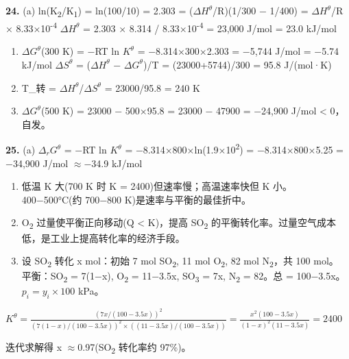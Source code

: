 \documentclass[a4paper,11pt]{ctexart}
\newcommand{\箭}{\ensuremath{\rightarrow}}
\newcommand{\左箭}{\ensuremath{\leftarrow}}
\newcommand{\上箭}{\ensuremath{\uparrow}}
\newcommand{\下箭}{\ensuremath{\downarrow}}
\newcommand{\衡}{\ensuremath{\rightleftharpoons}}
\newcommand{\双箭}{\ensuremath{\leftrightarrow}}
\newcommand{\约等于}{\ensuremath{\approx}}
\newcommand{\小于等于}{\ensuremath{\leq}}
\newcommand{\大于等于}{\ensuremath{\geq}}
\newcommand{\不等于}{\ensuremath{\neq}}
\newcommand{\西格马}{\ensuremath{\sigma}}
\newcommand{\派}{\ensuremath{\pi}}
\begin{document}
\textbf{24.}
(a) ln(K\textsubscript{2}/K\textsubscript{1}) = ln(100/10) = 2.303 = (\(\Delta H^\theta\)/R)(1/300 − 1/400) = \(\Delta H^\theta\)/R × 8.33×10\textsuperscript{-4}
\(\Delta H^\theta\) = 2.303 × 8.314 / 8.33×10\textsuperscript{-4} = 23,000 J/mol = 23.0 kJ/mol

\begin{enumerate}
\def\labelenumi{(\alph{enumi})}
\setcounter{enumi}{1}
\item
  \(\Delta G^\theta\)(300 K) = −RT ln \(K^\theta\) = −8.314×300×2.303 = −5,744 J/mol = −5.74 kJ/mol
  \(\Delta S^\theta\) = (\(\Delta H^\theta\) − \(\Delta G^\theta\))/T = (23000+5744)/300 = 95.8 J/(mol·K)
\item
  T\_转 = \(\Delta H^\theta\)/\(\Delta S^\theta\) = 23000/95.8 = 240 K
\item
  \(\Delta G^\theta\)(500 K) = 23000 − 500×95.8 = 23000 − 47900 = −24,900 J/mol \textless{} 0，自发。
\end{enumerate}

\textbf{25.}
(a) \(\Delta_r G^\theta\) = −RT ln \(K^\theta\) = −8.314×800×ln(1.9×10\textsuperscript{2}) = −8.314×800×5.25 = −34,900 J/mol \约等于 −34.9 kJ/mol

\begin{enumerate}
\def\labelenumi{(\alph{enumi})}
\setcounter{enumi}{1}
\item
  低温 K 大(700 K 时 K = 2400)但速率慢；高温速率快但 K 小。400−500°C(约 700−800 K)是速率与平衡的最佳折中。
\item
  O\textsubscript{2} 过量使平衡正向移动(Q \textless{} K)，提高 SO\textsubscript{2} 的平衡转化率。过量空气成本低，是工业上提高转化率的经济手段。
\item
  设 SO\textsubscript{2} 转化 x mol：初始 7 mol SO\textsubscript{2}, 11 mol O\textsubscript{2}, 82 mol N\textsubscript{2}，共 100 mol。
  平衡：SO\textsubscript{2} = 7(1−x), O\textsubscript{2} = 11−3.5x, SO\textsubscript{3} = 7x, N\textsubscript{2} = 82。总 = 100−3.5x。
  \(p_i = y_i \times 100\) kPa。
\end{enumerate}

\(K^\theta = \frac{(7x/(100-3.5x))^2}{(7(1-x)/(100-3.5x))^2 \times ((11-3.5x)/(100-3.5x))} = \frac{x^2(100-3.5x)}{(1-x)^2(11-3.5x)} = 2400\)

迭代求解得 x \约等于 0.97(SO\textsubscript{2} 转化率约 97\%)。
\end{document}
